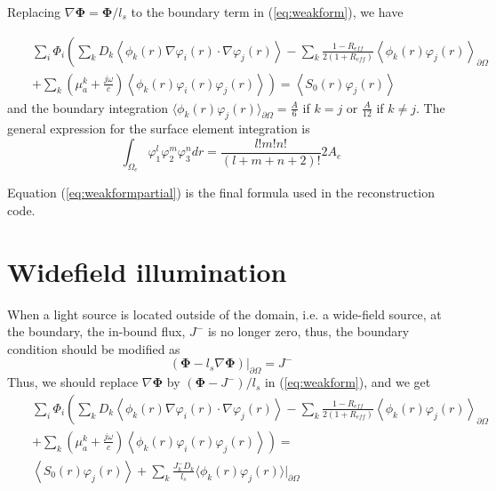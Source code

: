 \documentclass{article}
\begin{document}
Replacing $\nabla{\boldsymbol\Phi}=\boldsymbol\Phi/l_s$ to the boundary term in (\ref{eq:weakform}), we
have

\begin{eqnarray}
\label{eq:weakformpartial}\nonumber&&\sum_{i}\Phi_i\left(\sum_{k}D_k\left\langle
\phi_k(r)\nabla\varphi_i(r)\cdot\nabla\varphi_j(r)\right\rangle -
\sum_{k}\frac{1-R_{eff}}{2(1+R_{eff})}\left\langle
\phi_k(r)\varphi_j(r)\right\rangle_{\partial\Omega}\right.
\\&&\left.+\sum_{k}\left(\mu_{a}^k+\frac{j\omega}{c}\right)\left\langle\phi_k(r)\varphi_i(r)\varphi_j(r)\right\rangle\right)=\left\langle
S_0(r)\varphi_j(r)\right\rangle
\end{eqnarray}
and the boundary integration $\langle\phi_k(r)\varphi_j(r)\rangle_{\partial\Omega}=\frac{A}{6}$ if $k=j$ 
or $\frac{A}{12}$ if $k\ne j$. The general expression for the surface element integration is
\begin{equation}
\int_{\Omega_e}\varphi_1^l\varphi_2^m\varphi_3^ndr=\frac{l!m!n!}{(l+m+n+2)!}2A_e
\end{equation}


Equation (\ref{eq:weakformpartial}) is the final formula used in
the reconstruction code.

\section{Widefield illumination}
When a light source is located outside of the domain, i.e. a wide-field source, at the boundary, the 
in-bound flux, $J^-$ is no longer zero, thus, the boundary condition should be modified as
\begin{equation}
\label{eq:widefieldsrc} \left(\boldsymbol\Phi-l_s\nabla{\boldsymbol\Phi}\right)|_{\partial\Omega}=J^-
\end{equation}
Thus, we should replace $\nabla{\boldsymbol\Phi}$ by $(\boldsymbol\Phi - J^-)/l_s$ in (\ref{eq:weakform}), and we get
\begin{eqnarray}\nonumber
\label{eq:weakformwidefield}\nonumber&&\sum_{i}\Phi_i\left(\sum_{k}D_k\left\langle
\phi_k(r)\nabla\varphi_i(r)\cdot\nabla\varphi_j(r)\right\rangle -
\sum_{k}\frac{1-R_{eff}}{2(1+R_{eff})}\left\langle
\phi_k(r)\varphi_j(r)\right\rangle_{\partial\Omega}\right.
\\&&\left.+\sum_{k}\left(\mu_{a}^k+\frac{j\omega}{c}\right)\left\langle\phi_k(r)\varphi_i(r)\varphi_j(r)\right\rangle\right)=\\\nonumber
&& \left\langle S_0(r)\varphi_j(r)\right\rangle + \sum_k\frac{J^-_kD_k}{l_s}\langle\phi_k(r)\varphi_j(r)\rangle|_{\partial\Omega}
\end{eqnarray}
\end{document}
